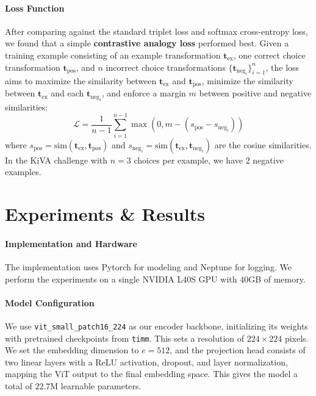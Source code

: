 \documentclass[twocolumn]{article} %
\begin{document}
\paragraph{Loss Function}
After comparing against the standard triplet loss and softmax cross-entropy loss, we found that a simple \textbf{contrastive analogy loss} \cite{chopra2005learning} performed best. Given a training example consisting of an example transformation $\mathbf{t}_{\text{ex}}$, one correct choice transformation $\mathbf{t}_{\text{pos}}$, and $n$ incorrect choice transformations $\{\mathbf{t}_{\text{neg}_i}\}_{i=1}^{n}$, the loss aims to maximize the similarity between $\mathbf{t}_{\text{ex}}$ and $\mathbf{t}_{\text{pos}}$, minimize the similarity between $\mathbf{t}_{\text{ex}}$ and each $\mathbf{t}_{\text{neg}_i}$, and enforce a margin $m$ between positive and negative similarities:
\begin{equation}
\mathcal{L} = \frac{1}{n-1}\sum_{i=1}^{n-1} \max\left(0, m - \left(s_{\text{pos}} - s_{\text{neg}_i}\right)\right)
\end{equation}
where $s_{\text{pos}} = \text{sim}(\mathbf{t}_{\text{ex}}, \mathbf{t}_{\text{pos}})$ and $s_{\text{neg}_i} = \text{sim}(\mathbf{t}_{\text{ex}}, \mathbf{t}_{\text{neg}_i})$ are the cosine similarities. In the KiVA challenge with $n=3$ choices per example, we have $2$ negative examples.


\section{Experiments \& Results}

\paragraph{Implementation and Hardware} The implementation uses Pytorch for modeling and Neptune for logging. We perform the experiments on a single NVIDIA L40S GPU with $40$GB of memory.

\paragraph{Model Configuration}
We use \texttt{vit\_small\_patch16\_224} as our encoder backbone, initializing its weights with pretrained checkpoints from \texttt{timm}. This sets a resolution of $224 \times 224$ pixels. We set the embedding dimension to $e=512$, and the projection head consists of two linear layers with a ReLU activation, dropout, and layer normalization, mapping the ViT output to the final embedding space. This gives the model a total of $22.7$M learnable parameters.
\end{document}
